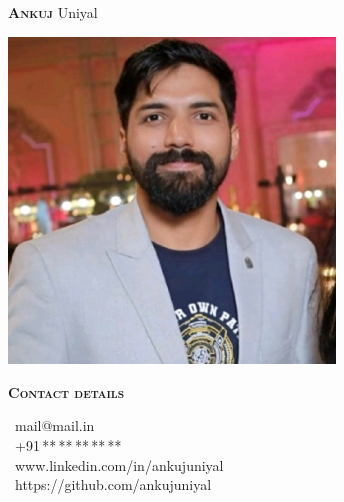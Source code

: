 \documentclass[11pt, a4paper]{article}
\newcommand{\headleft}[1]{\vspace*{3ex}\textsc{\textbf{#1}}\par%
    \vspace*{-1.5ex}\hrulefill\par\vspace*{0.7ex}}
\begin{document}
\setlength{\topskip}{0pt}
\setlength{\parindent}{0pt}
\setlength{\parskip}{0pt}
\setlength{\fboxsep}{0pt}
\pagestyle{empty}
\raggedbottom

\begin{minipage}[t]{0.33\textwidth} %
\colorbox{cvblue}{\begin{minipage}[t][5mm][t]{\textwidth}\null\hfill\null\end{minipage}}

\vspace{-.2ex} %
\colorbox{cvblue!90}{\color{white}  %
\textwidth\relax%
\begin{minipage}[t][293mm][t]{0.82\textwidth}
\raggedright
\vspace*{2.5ex}

\Large \textbf{\textsc{Ankuj}} Uniyal \normalsize 

\null\hfill\includegraphics[width=0.65\textwidth]{ankuj_resume_profile_photo}\hfill\null

\vspace*{0.5ex} %

\headleft{Contact details}
\small %
\faSend\ {\small mail@mail.in} \\[0.4ex]
\faMobilePhone\ +91\,**\,**\,**\,**\,** \\[0.4ex]
\faLinkedin\ {\small www.linkedin.com/in/ankujuniyal } \\[0.4ex]
\faGithub\ {\small https://github.com/ankujuniyal} \\[0.4ex]
\normalsize


\end{minipage}}
\end{minipage}
\end{document}

